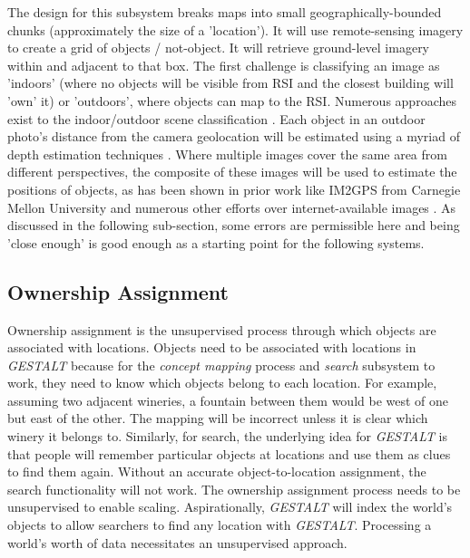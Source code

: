 The design for this subsystem breaks maps into small geographically-bounded chunks (approximately the size of a 'location'). 
It will use remote-sensing imagery to create a grid of objects / not-object. It will retrieve ground-level imagery within and adjacent to that box.
The first challenge is classifying an image as 'indoors' (where no objects will be visible from RSI and the closest building will 'own' it) or 'outdoors', where objects can map to the RSI. Numerous approaches exist to the indoor/outdoor scene classification \cite{Tong2017}. 
Each object in an outdoor photo's distance from the camera geolocation will be estimated using a myriad of depth estimation techniques \cite{Ming2021,Liu2020}. 
Where multiple images cover the same area from different perspectives, the composite of these images will be used to estimate the positions of objects, as has been shown in prior work like IM2GPS from Carnegie Mellon University \cite{Hays2008} and numerous other efforts over internet-available images \cite{Snavley2011}. 
As discussed in the following sub-section, some errors are permissible here and being 'close enough' is good enough as a starting point for the following systems. 

\subsection{Ownership Assignment}
Ownership assignment is the unsupervised process through which objects are associated with locations. 
Objects need to be associated with locations in \textit{GESTALT} because for the \textit{concept mapping} process and \textit{search} subsystem to work, they need to know which objects belong to each location.
For example, assuming two adjacent wineries, a fountain between them would be west of one but east of the other. The mapping will be incorrect unless it is clear which winery it belongs to. 
Similarly, for search, the underlying idea for \textit{GESTALT} is that people will remember particular objects at locations and use them as clues to find them again. Without an accurate object-to-location assignment, the search functionality will not work. 
The ownership assignment process needs to be unsupervised to enable scaling. Aspirationally, \textit{GESTALT} will index the world's objects to allow searchers to find any location with \textit{GESTALT}. Processing a world's worth of data necessitates an unsupervised approach. 

